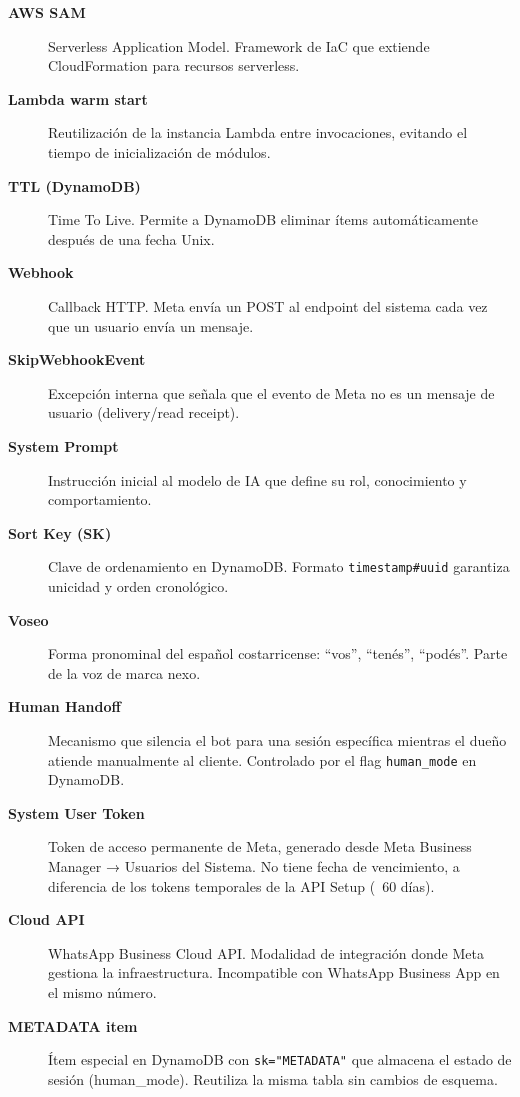 \documentclass[12pt,a4paper]{article}
\begin{document}
\begin{description}
  \item[\textbf{AWS SAM}] Serverless Application Model. Framework de IaC que extiende CloudFormation para recursos serverless.
  \item[\textbf{Lambda warm start}] Reutilización de la instancia Lambda entre invocaciones, evitando el tiempo de inicialización de módulos.
  \item[\textbf{TTL (DynamoDB)}] Time To Live. Permite a DynamoDB eliminar ítems automáticamente después de una fecha Unix.
  \item[\textbf{Webhook}] Callback HTTP. Meta envía un POST al endpoint del sistema cada vez que un usuario envía un mensaje.
  \item[\textbf{SkipWebhookEvent}] Excepción interna que señala que el evento de Meta no es un mensaje de usuario (delivery/read receipt).
  \item[\textbf{System Prompt}] Instrucción inicial al modelo de IA que define su rol, conocimiento y comportamiento.
  \item[\textbf{Sort Key (SK)}] Clave de ordenamiento en DynamoDB. Formato \texttt{timestamp\#uuid} garantiza unicidad y orden cronológico.
  \item[\textbf{Voseo}] Forma pronominal del español costarricense: ``vos'', ``tenés'', ``podés''. Parte de la voz de marca nexo.
  \item[\textbf{Human Handoff}] Mecanismo que silencia el bot para una sesión específica mientras el dueño atiende manualmente al cliente. Controlado por el flag \texttt{human\_mode} en DynamoDB.
  \item[\textbf{System User Token}] Token de acceso permanente de Meta, generado desde Meta Business Manager → Usuarios del Sistema. No tiene fecha de vencimiento, a diferencia de los tokens temporales de la API Setup (~60 días).
  \item[\textbf{Cloud API}] WhatsApp Business Cloud API. Modalidad de integración donde Meta gestiona la infraestructura. Incompatible con WhatsApp Business App en el mismo número.
  \item[\textbf{METADATA item}] Ítem especial en DynamoDB con \texttt{sk="METADATA"} que almacena el estado de sesión (human\_mode). Reutiliza la misma tabla sin cambios de esquema.
\end{description}

\vfill
\begin{center}
\end{center}
\end{document}
